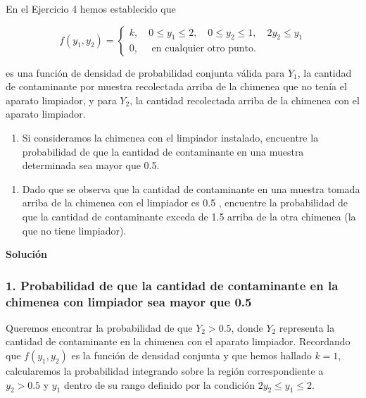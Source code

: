 \documentclass[
]{article}
\providecommand{\tightlist}{%
  \setlength{\itemsep}{0pt}\setlength{\parskip}{0pt}}
\begin{document}
En el Ejercicio 4 hemos establecido que

\[
f\left(y_{1}, y_{2}\right)=\left\{\begin{array}{l}
k, \quad 0 \leq y_{1} \leq 2, \quad 0 \leq y_{2} \leq 1, \quad 2 y_{2} \leq y_{1} \\
0, \quad \text { en cualquier otro punto. }
\end{array}\right.
\]

es una función de densidad de probabilidad conjunta válida para \(Y_{1}\), la cantidad de contaminante por muestra recolectada arriba de la chimenea que no tenía el aparato limpiador, y para \(Y_{2}\), la cantidad recolectada arriba de la chimenea con el aparato limpiador.

\begin{enumerate}
\def\labelenumi{\arabic{enumi}.}
\tightlist
\item
  Si consideramos la chimenea con el limpiador instalado, encuentre la probabilidad de que la cantidad de contaminante en una muestra determinada sea mayor que 0.5.
\end{enumerate}

\begin{enumerate}
\def\labelenumi{\alph{enumi}.}
\setcounter{enumi}{1}
\tightlist
\item
  Dado que se observa que la cantidad de contaminante en una muestra tomada arriba de la chimenea con el limpiador es 0.5 , encuentre la probabilidad de que la cantidad de contaminante exceda de 1.5 arriba de la otra chimenea (la que no tiene limpiador).
\end{enumerate}

\textbf{Solución}

\subsubsection{1. Probabilidad de que la cantidad de contaminante en la chimenea con limpiador sea mayor que 0.5}\label{probabilidad-de-que-la-cantidad-de-contaminante-en-la-chimenea-con-limpiador-sea-mayor-que-0.5}

Queremos encontrar la probabilidad de que \(Y_2 > 0.5\), donde \(Y_2\) representa la cantidad de contaminante en la chimenea con el aparato limpiador. Recordando que \(f(y_1, y_2)\) es la función de densidad conjunta y que hemos hallado \(k = 1\), calcularemos la probabilidad integrando sobre la región correspondiente a \(y_2 > 0.5\) y \(y_1\) dentro de su rango definido por la condición \(2y_2 \leq y_1 \leq 2\).
\end{document}
